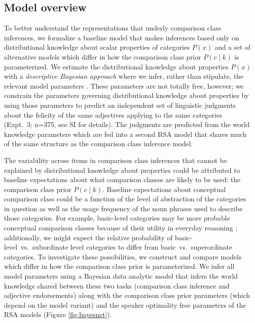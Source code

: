 \documentclass[doc]{apa6}
\begin{document}
\subsection{Model overview}

To better understand the representations that underly comparison class inferences, we formalize a baseline model that makes inferences based only on distributional knowledge about scalar properties of categories $P(x)$ and a set of alternative models which differ in how the comparison class prior $P(c \mid k)$ is parameterized. 
We estimate the distributional knowledge about properties $P(x)$ with a \emph{descriptive Bayesian approach} where we infer, rather than stipulate, the relevant model parameters \cite{tauber2017}.
These parameters are not totally free, however; we constrain the parameters governing distributional knowledge about properties by using those parameters to predict an independent set of linguistic judgments about the felicity of the same adjectives applying to the same categories (Expt.~3; n=375, see SI for details). The judgments are predicted from the world knowledge parameters which are fed into a second RSA model that shares much of the same structure as the comparison class inference model.

The variability across items in comparison class inferences that cannot be explained by distributional knowledge about properties could be attributed to baseline expectations about what comparison classes are likely to be used: the comparison class prior $P(c \mid k)$. 
Baseline expectations about conceptual comparison class could be a function of the level of abstraction of the categories in question as well as the usage frequency of the noun phrases used to describe those categories. 
For example, basic-level categories may be more probable conceptual comparison classes because of their utility in everyday reasoning \cite{rosch1975family}; additionally, we might expect the relative probability of basic-level~vs.~subordinate level categories to differ from basic~vs.~superordinate categories.
To investigate these possibilities, we construct and compare models which differ in how the comparison class prior is parameterized.
We infer all model parameters using a Bayesian data analytic model that infers the world knowledge shared between these two tasks (comparison class inference and adjective endorsements) along with the comparison class prior parameters (which depend on the model variant) and the speaker optimality free parameters of the RSA models (Figure \ref{fig:bayesnet}). 
\end{document}
